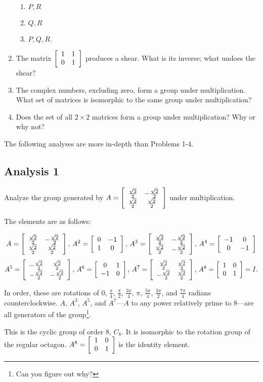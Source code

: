 \documentclass[../gatm.tex]{subfiles}
\begin{document}
\begin{enumerate}
\begin{multicols}{4}
\begin{enumerate}
\item ${P,R}$
\item ${Q,R}$
\item ${P,Q,R}.$
\end{enumerate}
\end{multicols}
\item The matrix $\left[\begin{array}{cc} 1 & 1 \\ 0 & 1 \end{array}\right]$ produces a shear. What is its inverse; what undoes the shear?
\item The complex numbers, excluding zero, form a group under multiplication. What set of matrices is isomorphic to the same group under multiplication?
\item Does the set of all $2\times 2$ matrices form a group under multiplication? Why or why not?
\end{enumerate}

The following analyses are more in-depth than Problems 1-4.

\subsection*{Analysis 1}

Analyze the group generated by $A=\left[\begin{array}{cc} \frac{\sqrt{2}}{2} & -\frac{\sqrt{2}}{2} \\ \frac{\sqrt{2}}{2} & \frac{\sqrt{2}}{2} \end{array}\right]$ under multiplication.

The elements are as follows:

$$A= \left[\begin{array}{cc} \frac{\sqrt{2}}{2} & -\frac{\sqrt{2}}{2} \\ \frac{\sqrt{2}}{2} & \frac{\sqrt{2}}{2} \end{array}\right],\, 
A^2 = \left[\begin{array}{cc} 0 & -1 \\ 1 & 0 \end{array}\right],\, 
A^3 = \left[\begin{array}{cc} \frac{\sqrt{2}}{2} & -\frac{\sqrt{2}}{2} \\ \frac{\sqrt{2}}{2} & -\frac{\sqrt{2}}{2} \end{array}\right],\, 
A^4 = \left[\begin{array}{cc} -1 & 0 \\ 0 & -1 \end{array}\right]$$
$$A^5 = \left[\begin{array}{cc} -\frac{\sqrt{2}}{2} & \frac{\sqrt{2}}{2} \\ -\frac{\sqrt{2}}{2} & -\frac{\sqrt{2}}{2} \end{array}\right],\, 
A^6 = \left[\begin{array}{cc} 0 & 1 \\ -1 & 0 \end{array}\right],\, 
A^7 = \left[\begin{array}{cc} \frac{\sqrt{2}}{2} & \frac{\sqrt{2}}{2} \\ -\frac{\sqrt{2}}{2} & \frac{\sqrt{2}}{2} \end{array}\right],\, 
A^8 = \left[\begin{array}{cc} 1 & 0 \\ 0 & 1 \end{array}\right] = I.$$

In order, these are rotations of $0$, $\frac{\pi}{4}$, $\frac{\pi}{2}$, $\frac{3\pi}{4}$, $\pi$, $\frac{5\pi}{4}$, $\frac{3\pi}{2}$, and $\frac{7\pi}{4}$ radians counterclockwise. $A$, $A^3$, $A^5$, and $A^7$---$A$ to any power relatively prime to $8$---are all generators of the group\footnote{Can you figure out why?}.

This is the cyclic group of order $8$, $C_8$. It is isomorphic to the rotation group of the regular octagon. $A^8=\left[\begin{array}{cc} 1 & 0 \\ 0 & 1 \end{array}\right]$ is the identity element. 
\end{document}
